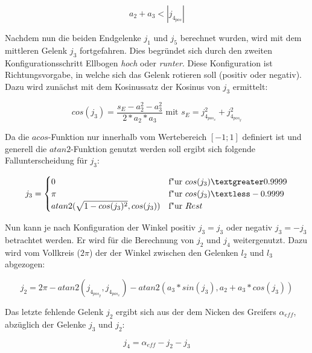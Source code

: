\begin{equation}
a_2 + a_3 < |j_{4_{pos}}|
\label{eq:30}
\end{equation}

Nachdem nun die beiden Endgelenke $j_1$ und $j_5$ berechnet wurden, wird mit dem mittleren Gelenk $j_3$ fortgefahren. Dies begründet sich durch den zweiten Konfigurationsschritt Ellbogen \textit{hoch} oder \textit{runter}. Diese Konfiguration ist Richtungsvorgabe, in welche sich das Gelenk rotieren soll (positiv oder negativ). Dazu wird zunächst mit dem Kosinussatz der Kosinus von $j_3$ ermittelt:

\begin{equation}
cos(j_3) = \dfrac{s_E - a_2^2 - a_3^2}{2 * a_2 * a_3} \text{ mit } s_E = j_{4_{pos_x}}^2 + j_{4_{pos_y}}^2 
\label{eq:32}
\end{equation}

Da die $acos$-Funktion nur innerhalb vom Wertebereich $[-1;1]$ definiert ist und generell die $atan2$-Funktion genutzt werden soll ergibt sich folgende Fallunterscheidung für $j_3$:

\begin{equation}
j_3 = 
\begin{cases}
0  & \text{f"ur } cos(j_3) \textgreater 0.9999 \\
\pi & \text{f"ur } cos(j_3) \textless -0.9999 \\
atan2(\sqrt{1 - cos(j_3)^2}, cos(j_3))  & \text{f"ur } Rest
\end{cases}
\label{eq:33}
\end{equation}

Nun kann je nach Konfiguration der Winkel positiv $j_3 = j_3$ oder negativ $j_3 = -j_3$ betrachtet werden. Er wird für die Berechnung von $j_2$ und $j_4$ weitergenutzt. Dazu wird vom Vollkreis ($2\pi$) der der Winkel zwischen den Gelenken $l_2$ und $l_3$ abgezogen:

\begin{equation}
j_2 = 2\pi - atan2(j_{4_{pos_y}}, j_{4_{pos_x}}) - atan2(a_3 * sin(j_3), a_2 + a_3 * cos(j_3))
\label{eq:34}
\end{equation}

Das letzte fehlende Gelenk $j_2$ ergibt sich aus der dem Nicken des Greifers $\alpha_{eff}$, abzüglich der Gelenke $j_3$ und $j_2$:

\begin{equation}
j_4 =  \alpha_{eff} - j_2 - j_3
\label{eq:345}
\end{equation}

